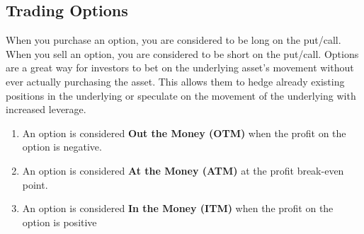 \subsection{Trading Options}
When you purchase an option, you are considered to be long on the put/call. When you sell an option, you are considered to be short on the put/call. Options are a great way for investors to bet on the underlying asset's movement without ever actually purchasing the asset. This allows them to hedge already existing positions in the underlying or speculate on the movement of the underlying with increased leverage. \cite{OptionsIntro}

\begin{enumerate}
    \item An option is considered \textbf{Out the Money (OTM)} when the profit on the option is negative. 
    \item An option is considered \textbf{At the Money (ATM)} at the profit break-even point. 
    \item An option is considered \textbf{In the Money (ITM)} when the profit on the option is positive
\end{enumerate}








